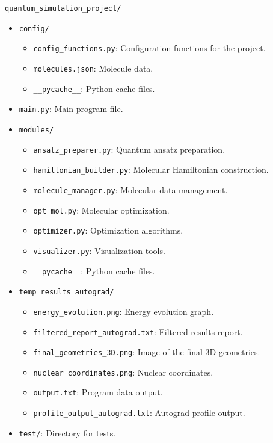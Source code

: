 \begin{ProjectStructure}
  \texttt{quantum\_simulation\_project/}
  \begin{itemize}[label={}, left=1em]
      \item \texttt{config/}
      \begin{itemize}[label={}, left=2em]
          \item \texttt{config\_functions.py}: Configuration functions for the project.
          \item \texttt{molecules.json}: Molecule data.
          \item \texttt{\_\_pycache\_\_}: Python cache files.
      \end{itemize}
      \item \texttt{main.py}: Main program file.
      \item \texttt{modules/}
      \begin{itemize}[label={}, left=2em]
          \item \texttt{ansatz\_preparer.py}: Quantum ansatz preparation.
          \item \texttt{hamiltonian\_builder.py}: Molecular Hamiltonian construction.
          \item \texttt{molecule\_manager.py}: Molecular data management.
          \item \texttt{opt\_mol.py}: Molecular optimization.
          \item \texttt{optimizer.py}: Optimization algorithms.
          \item \texttt{visualizer.py}: Visualization tools.
          \item \texttt{\_\_pycache\_\_}: Python cache files.
      \end{itemize}
      \item \texttt{temp\_results\_autograd/}
      \begin{itemize}[label={}, left=2em]
          \item \texttt{energy\_evolution.png}: Energy evolution graph.
          \item \texttt{filtered\_report\_autograd.txt}: Filtered results report.
          \item \texttt{final\_geometries\_3D.png}: Image of the final 3D geometries.
          \item \texttt{nuclear\_coordinates.png}: Nuclear coordinates.
          \item \texttt{output.txt}: Program data output.
          \item \texttt{profile\_output\_autograd.txt}: Autograd profile output.
      \end{itemize}
      \item \texttt{test/}: Directory for tests.
  \end{itemize}
\end{ProjectStructure}

